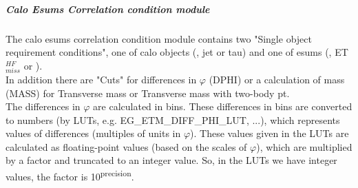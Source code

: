 

\subparagraph{Calo Esums Correlation condition module}
\label{sec:gtl:calo_esums_correlation_condition_module}

The calo esums correlation condition module contains two "Single object requirement conditions", one of calo objects (\egamma, jet or tau) and one of esums (\etm, ET$_{miss}^{HF}$ or \htm).\\
In addition there are "Cuts" for differences in $\varphi$ (DPHI) or a calculation of mass (MASS) for Transverse mass or Transverse mass with two-body pt.\\
The differences in $\varphi$ are calculated in bins. 
These differences in bins are converted to numbers (by LUTs, e.g. \small{EG\_ETM\_DIFF\_PHI\_LUT}\normalsize, ...),
which represents values of differences (multiples of units in $\varphi$).
These values given in the LUTs are calculated as floating-point values (based on the scales of $\varphi$), which are multiplied by a factor and truncated to an integer value.
So, in the LUTs we have integer values, the factor is 10\textsuperscript{\tiny{precision}\normalsize}.\\

